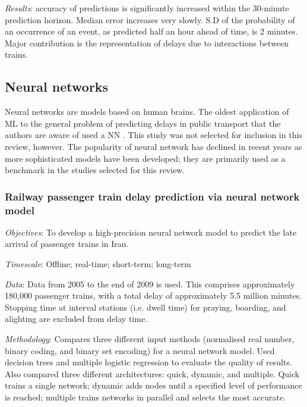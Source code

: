 \documentclass{article}
\begin{document}
\smallskip

\textit{Results}: accuracy of predictions is significantly increased within the 30-minute prediction horizon. Median error increases very slowly. S.D of the probability of an occurrence of an event, as predicted half an hour ahead of time, is 2 minutes. Major contribution is the representation of delays due to interactions between trains. 

\subsection{Neural networks}

Neural networks are models based on human brains. The oldest application of ML to the general problem of predicting delays in public transport that the authors are aware of used a NN \cite{peters_et_al_2005}.  This study was not selected for inclusion in this review, however. The popularity of neural network has declined in recent years as more sophisticated models have been developed; they are primarily used as a benchmark in the studies selected for this review. 

\subsubsection{Railway passenger train delay prediction via neural network model \cite{yaghini_et_al_2013}}

\textit{Objectives}: To develop a high-precision neural network model to predict the late arrival of passenger trains in Iran.

\smallskip

\textit{Timescale}: Offline; real-time; short-term; long-term

\smallskip

\textit{Data}: Data from 2005 to the end of 2009 is used. This comprises approximately 180,000 passenger trains, with a total delay of approximately 5.5 million minutes. Stopping time at interval stations (i.e. dwell time) for praying, boarding, and alighting are excluded from delay time.  

\smallskip

\textit{Methodology}: Compares three different input methods (normalised real number, binary coding, and binary set encoding) for a neural network model. Used decision trees and multiple logistic regression to evaluate the quality of results. Also compared three different architectures: quick, dynamic, and multiple. Quick trains a single network; dynamic adds nodes until a specified level of performance is reached; multiple trains networks in parallel and selects the most accurate. 
\end{document}
